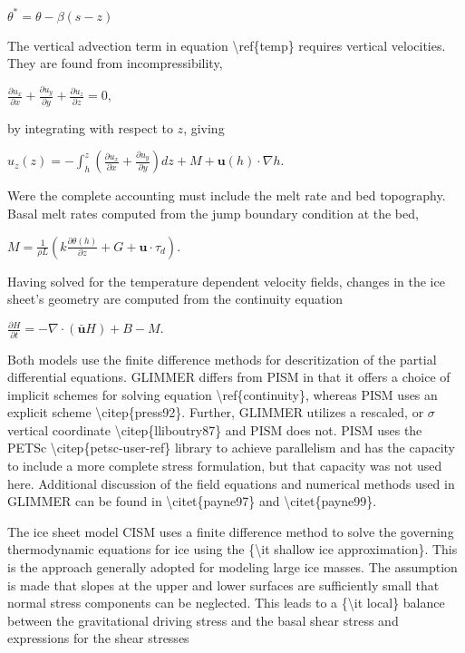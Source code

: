 $
\theta^* = \theta - \beta (s-z)
$

The vertical advection term in equation \textbackslash{}ref\{temp\}
requires vertical velocities. They are found from incompressibility,

$
\frac{\partial u_x}{\partial x} + 
\frac{\partial u_y}{\partial y} +
\frac{\partial u_z}{\partial z} = 0,
$

by integrating with respect to $z$, giving

$
u_z(z) = -\int_h^z \left( \frac{\partial u_x}{\partial x} + \frac{\partial
u_y}{\partial y}\right ) dz + M + \mathbf{u}(h) \cdot \nabla h.
$

Were the complete accounting must include the melt rate and bed
topography. Basal melt rates computed from the jump boundary condition
at the bed,

$
M = \frac{1}{\rho L} \left ( k \frac{\partial
\theta(h)}{\partial z} + G + \mathbf{u} \cdot \tau_d \right ).
$

Having solved for the temperature dependent velocity fields, changes in
the ice sheet's geometry are computed from the continuity equation

$
\frac{\partial H}{\partial t} = - \nabla \cdot (\mathbf{\bar u} H) + B - M.
$

Both models use the finite difference methods for descritization of the
partial differential equations. GLIMMER differs from PISM in that it
offers a choice of implicit schemes for solving equation
\textbackslash{}ref\{continuity\}, whereas PISM uses an explicit scheme
\textbackslash{}citep\{press92\}. Further, GLIMMER utilizes a rescaled,
or $\sigma$ vertical coordinate \textbackslash{}citep\{lliboutry87\} and
PISM does not. PISM uses the PETSc
\textbackslash{}citep\{petsc-user-ref\} library to achieve parallelism
and has the capacity to include a more complete stress formulation, but
that capacity was not used here. Additional discussion of the field
equations and numerical methods used in GLIMMER can be found in
\textbackslash{}citet\{payne97\} and \textbackslash{}citet\{payne99\}.

The ice sheet model CISM uses a finite difference method to solve the
governing thermodynamic equations for ice using the \{\textbackslash{}it
shallow ice approximation\}. This is the approach generally adopted for
modeling large ice masses. The assumption is made that slopes at the
upper and lower surfaces are sufficiently small that normal stress
components can be neglected. This leads to a \{\textbackslash{}it
local\} balance between the gravitational driving stress and the basal
shear stress and expressions for the shear stresses

